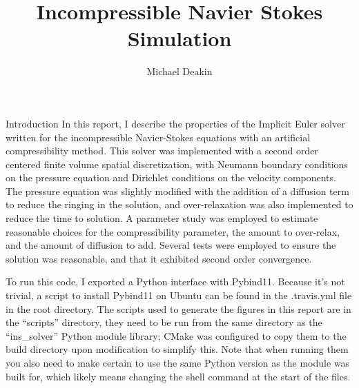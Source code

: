 \documentclass{article}
\title{Incompressible Navier Stokes Simulation}
\author{Michael Deakin}
\begin{document}
\maketitle

\begin{section}{Introduction}
In this report, I describe the properties of the Implicit Euler solver written for the incompressible Navier-Stokes equations with an artificial compressibility method.
This solver was implemented with a second order centered finite volume spatial discretization,
with Neumann boundary conditions on the pressure equation and Dirichlet conditions on the velocity components.
The pressure equation was slightly modified with the addition of a diffusion term to reduce the ringing in the solution,
and over-relaxation was also implemented to reduce the time to solution.
A parameter study was employed to estimate reasonable choices for the compressibility parameter,
the amount to over-relax, and the amount of diffusion to add.
Several tests were employed to ensure the solution was reasonable,
and that it exhibited second order convergence.

To run this code, I exported a Python interface with Pybind11.
Because it's not trivial, a script to install Pybind11 on Ubuntu can be found in the
.travis.yml file in the root directory.
The scripts used to generate the figures in this report are in the ``scripts'' directory,
they need to be run from the same directory as the ``ins\_solver'' Python module library;
CMake was configured to copy them to the build directory upon modification to simplify this.
Note that when running them you also need to make certain to use the same Python version
as the module was built for, which likely means changing the shell command at the start of the files.
\end{section}
\end{document}
